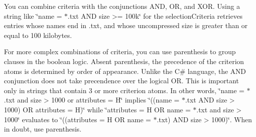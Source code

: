 \tabulinesep=1mm


You can combine criteria with the conjunctions A\+ND, OR, and X\+OR. Using a string like \char`\"{}name = $\ast$.\+txt A\+N\+D size >= 100k\char`\"{} for the selection\+Criteria retrieves entries whose names end in .txt, and whose uncompressed size is greater than or equal to 100 kilobytes. 

For more complex combinations of criteria, you can use parenthesis to group clauses in the boolean logic. Absent parenthesis, the precedence of the criterion atoms is determined by order of appearance. Unlike the C\# language, the A\+ND conjunction does not take precendence over the logical OR. This is important only in strings that contain 3 or more criterion atoms. In other words, \char`\"{}name = $\ast$.\+txt
  and size > 1000 or attributes = H\char`\"{} implies \char`\"{}((name = $\ast$.\+txt A\+N\+D size
  > 1000) O\+R attributes = H)\char`\"{} while \char`\"{}attributes = H O\+R name = $\ast$.\+txt
  and size > 1000\char`\"{} evaluates to \char`\"{}((attributes = H O\+R name = $\ast$.\+txt)
  A\+N\+D size > 1000)\char`\"{}. When in doubt, use parenthesis. 

